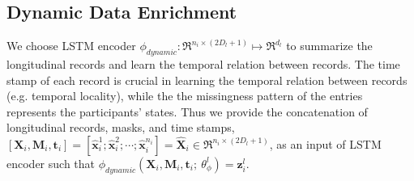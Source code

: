 \subsection{Dynamic Data Enrichment}
We choose LSTM encoder $\phi_{dynamic}: \Re^{n_i \times (2 D_l + 1)} \mapsto \Re^{d_l}$ to summarize the longitudinal records and learn the temporal relation between records. The time stamp of each record is crucial in learning the temporal relation between records (e.g. temporal locality), while the the missingness pattern of the entries represents the participants' states. Thus we provide the concatenation of longitudinal records, masks, and time stamps, $[\mathbf{X}_i, \mathbf{M}_i, \mathbf{t}_i] = [\hat{\mathbf{x}}_i^1; \hat{\mathbf{x}}_i^2; \cdots; \hat{\mathbf{x}}_i^{n_i}] = \hat{\mathbf{X}}_i \in \Re^{n_i \times (2 D_l + 1)}$, as an input of LSTM encoder such that $\phi_{dynamic}(\mathbf{X}_i, \mathbf{M}_i, \mathbf{t}_i;\ \theta_{\phi}^l) = \mathbf{z}_i^l$. 

